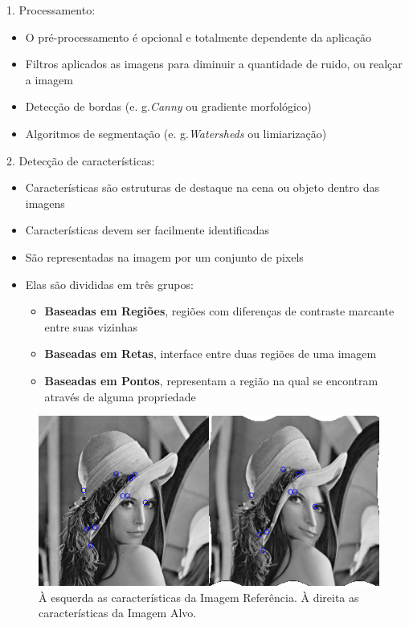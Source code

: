 \documentclass[t]{beamer}
\begin{document}
\begin{frame}
  1. Processamento:
  \begin{itemize}
    \item O pré-processamento é opcional e totalmente dependente da aplicação
    \item Filtros aplicados as imagens para diminuir a quantidade de ruido, ou realçar a imagem
    \item Detecção de bordas (e. g.\textit{Canny}\cite{canny1986computational} ou gradiente morfológico)
    \item Algoritmos de segmentação (e. g.\textit{Watersheds} \cite{vincent1991watersheds} ou limiarização)
  \end{itemize}
\end{frame}

\begin{frame}
  2. Detecção de características:
  \begin{itemize}
    \item Características são estruturas de destaque na cena ou objeto dentro das imagens
    \item Características devem ser facilmente identificadas
    \item São representadas na imagem por um conjunto de pixels
    \item Elas são divididas em três grupos:
    \begin{itemize}
      \item \textbf{Baseadas em Regiões}, regiões com diferenças de contraste marcante entre suas vizinhas
      \item \textbf{Baseadas em Retas}, interface entre duas regiões de uma imagem
      \item \textbf{Baseadas em Pontos}, representam a região na qual se encontram através de alguma propriedade
    \end{itemize}
  \end{itemize}
\end{frame}

\begin{frame}
  \begin{figure}[!h]
    \begin{center}
      \includegraphics[width=1.0\textwidth]{figuras/Features.png}
      \caption{À esquerda as características da Imagem Referência. À direita as características da Imagem Alvo.}
    \end{center}
  \end{figure}
\end{frame}
\end{document}
